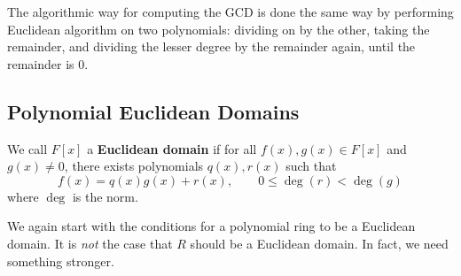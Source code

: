   The algorithmic way for computing the GCD is done the same way by performing Euclidean algorithm on two polynomials: dividing on by the other, taking the remainder, and dividing the lesser degree by the remainder again, until the remainder is $0$. 

\subsection{Polynomial Euclidean Domains}

  \begin{definition}
    We call $F[x]$ a \textbf{Euclidean domain} if for all $f(x), g(x) \in F[x]$ and $g(x) \neq 0$, there exists polynomials $q(x), r(x)$ such that 
    \begin{equation}
      f(x) = q(x) g(x) + r(x), \qquad 0 \leq \deg(r) < \deg(g)
    \end{equation}
    where $\deg$ is the norm.
  \end{definition}

  \begin{example}[]
    
  \end{example}

  We again start with the conditions for a polynomial ring to be a Euclidean domain. It is \textit{not} the case that $R$ should be a Euclidean domain. In fact, we need something stronger. 

